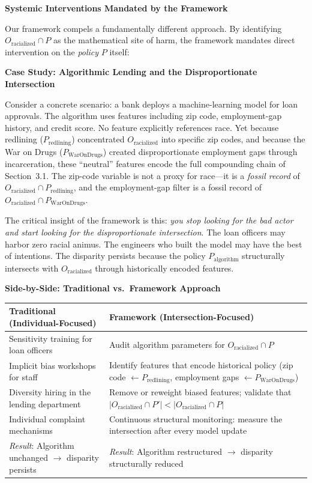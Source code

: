 \documentclass[12pt,openany]{book}
\begin{document}
\textbf{Systemic Interventions Mandated by the Framework}

Our framework compels a fundamentally different approach. By identifying $O_{\text{racialized}} \cap P$ as the mathematical site of harm, the framework mandates direct intervention on the \textit{policy} $P$ itself:

\textbf{Case Study: Algorithmic Lending and the Disproportionate Intersection}

Consider a concrete scenario: a bank deploys a machine-learning model for loan approvals. The algorithm uses features including zip code, employment-gap history, and credit score. No feature explicitly references race. Yet because redlining ($P_{\text{redlining}}$) concentrated $O_{\text{racialized}}$ into specific zip codes, and because the War on Drugs ($P_{\text{WarOnDrugs}}$) created disproportionate employment gaps through incarceration, these ``neutral'' features encode the full compounding chain of Section~3.1. The zip-code variable is not a proxy for race---it is a \textit{fossil record} of $O_{\text{racialized}} \cap P_{\text{redlining}}$, and the employment-gap filter is a fossil record of $O_{\text{racialized}} \cap P_{\text{WarOnDrugs}}$.

The critical insight of the framework is this: \textit{you stop looking for the bad actor and start looking for the disproportionate intersection}. The loan officers may harbor zero racial animus. The engineers who built the model may have the best of intentions. The disparity persists because the policy $P_{\text{algorithm}}$ structurally intersects with $O_{\text{racialized}}$ through historically encoded features.

\medskip
\noindent\textbf{Side-by-Side: Traditional vs.\ Framework Approach}

\medskip
\noindent
\begin{tabular}{@{}p{}|p{}@{}}
\textbf{Traditional (Individual-Focused)} & \textbf{Framework (Intersection-Focused)} \\
\hline
Sensitivity training for loan officers & Audit algorithm parameters for $O_{\text{racialized}} \cap P$ \\[4pt]
Implicit bias workshops for staff & Identify features that encode historical policy (zip code $\leftarrow P_{\text{redlining}}$, employment gaps $\leftarrow P_{\text{WarOnDrugs}}$) \\[4pt]
Diversity hiring in the lending department & Remove or reweight biased features; validate that $|O_{\text{racialized}} \cap P'| < |O_{\text{racialized}} \cap P|$ \\[4pt]
Individual complaint mechanisms & Continuous structural monitoring: measure the intersection after every model update \\[4pt]
\textit{Result}: Algorithm unchanged $\rightarrow$ disparity persists & \textit{Result}: Algorithm restructured $\rightarrow$ disparity structurally reduced \\
\end{tabular}
\end{document}
